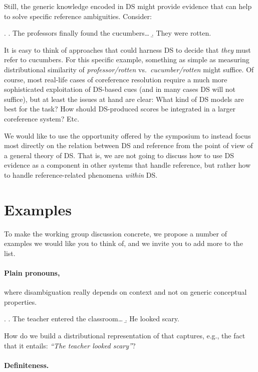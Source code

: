 \documentclass[a4paper,12pt]{article}
\begin{document}
Still, the generic knowledge encoded in DS might provide evidence that
can help to solve specific reference ambiguities. Consider:

\ex. \a. The professors finally found the cucumbers\ldots
\b. They were rotten.

It is easy to think of approaches that could harness DS to decide that
\emph{they} must refer to cucumbers. For this specific example,
something as simple as measuring distributional similarity of
\emph{professor/rotten} vs.~\emph{cucumber/rotten} might suffice. Of
course, most real-life cases of coreference resolution require a much
more sophisticated exploitation of DS-based cues (and in many cases DS
will not suffice), but at least the issues at hand are clear: What
kind of DS models are best for the task? How should DS-produced scores
be integrated in a larger coreference system? Etc.

We would like to use the opportunity offered by the symposium to
instead focus most directly on the relation between DS and reference
from the point of view of a general theory of DS. That is, we are not
going to discuss how to use DS evidence as a component in other
systems that handle reference, but rather how to handle
reference-related phenomena \emph{within} DS.

\section{Examples}
\label{sec:examples}

To make the working group discussion concrete, we propose a number of
examples we would like you to think of, and we invite you to add more
to the list.

\paragraph{Plain pronouns,} where disambiguation really depends on
context and not on generic conceptual properties.

\ex. \a. The teacher entered the classroom\ldots 
\b. He looked scary.

How do we build a distributional representation of \Last[b] that
captures, e.g., the fact that it entails: \emph{``The teacher looked
  scary''}?

\paragraph{Definiteness.}
\end{document}
